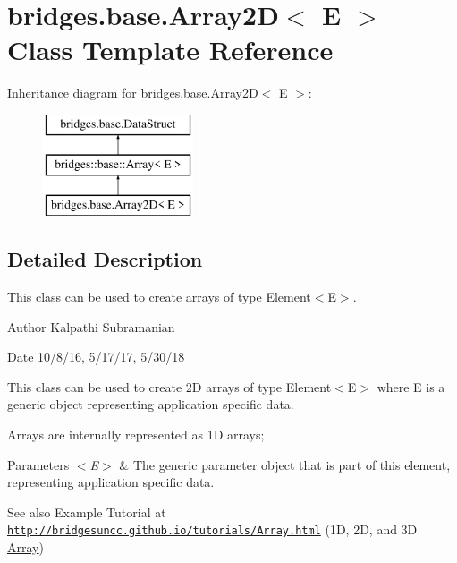 \hypertarget{classbridges_1_1base_1_1_array2_d}{}\section{bridges.\+base.\+Array2D$<$ E $>$ Class Template Reference}
\label{classbridges_1_1base_1_1_array2_d}
Inheritance diagram for bridges.\+base.\+Array2D$<$ E $>$\+:\begin{figure}[H]
\begin{center}
\leavevmode
\includegraphics[height=3.000000cm]{classbridges_1_1base_1_1_array2_d}
\end{center}
\end{figure}


\subsection{Detailed Description}
This class can be used to create arrays of type Element$<$\+E$>$. 

\begin{DoxyAuthor}{Author}
Kalpathi Subramanian
\end{DoxyAuthor}
\begin{DoxyDate}{Date}
10/8/16, 5/17/17, 5/30/18
\end{DoxyDate}
This class can be used to create 2D arrays of type Element$<$\+E$>$ where E is a generic object representing application specific data.

Arrays are internally represented as 1D arrays;


\begin{DoxyParams}{Parameters}
{\em $<$\+E$>$} & The generic parameter object that is part of this element, representing application specific data.\\
\hline
\end{DoxyParams}
\begin{DoxySeeAlso}{See also}
Example Tutorial at ~\newline
 \href{http://bridgesuncc.github.io/tutorials/Array.html}{\tt http\+://bridgesuncc.\+github.\+io/tutorials/\+Array.\+html} (1D, 2D, and 3D \hyperlink{classbridges_1_1base_1_1_array}{Array})~\newline
 
\end{DoxySeeAlso}
